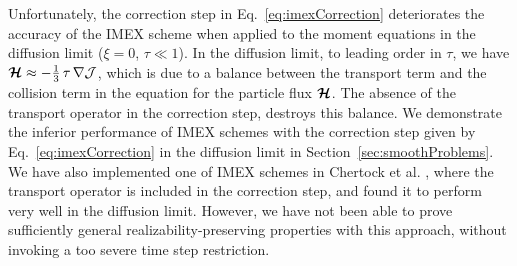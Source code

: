 Unfortunately, the correction step in Eq.~\eqref{eq:imexCorrection} deteriorates the accuracy of the IMEX scheme when applied to the moment equations in the diffusion limit ($\xi=0$, $\tau\ll 1$).  
In the diffusion limit, to leading order in $\tau$, we have $\boldsymbol{\mathcal{H}}\approx-\frac{1}{3}\,\tau\,\nabla\mathcal{J}$, which is due to a balance between the transport term and the collision term in the equation for the particle flux $\boldsymbol{\mathcal{H}}$.  
The absence of the transport operator in the correction step, destroys this balance.  
We demonstrate the inferior performance of IMEX schemes with the correction step given by Eq.~\eqref{eq:imexCorrection} in the diffusion limit in Section~\ref{sec:smoothProblems}.  
We have also implemented one of IMEX schemes in Chertock et al. \cite{chertock_etal_2015}, where the transport operator is included in the correction step, and found it to perform very well in the diffusion limit.  
However, we have not been able to prove sufficiently general realizability-preserving properties with this approach, without invoking a too severe time step restriction.  

